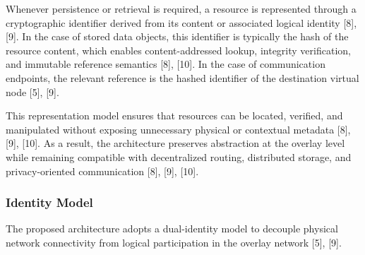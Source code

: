 \documentclass[12pt,a4paper]{article}
\begin{document}
Whenever persistence or retrieval is required, a resource is represented through a
cryptographic identifier derived from its content or associated logical identity [8], [9].
In the case of stored data objects, this identifier is typically the hash of the resource content,
which enables content-addressed lookup, integrity verification, and immutable
reference semantics [8], [10]. In the case of communication endpoints, the relevant reference is
the hashed identifier of the destination virtual node [5], [9].

This representation model ensures that resources can be located, verified, and
manipulated without exposing unnecessary physical or contextual metadata [8], [9], [10]. As a
result, the architecture preserves abstraction at the overlay level while remaining
compatible with decentralized routing, distributed storage, and privacy-oriented
communication [8], [9], [10].

\subsubsection{Identity Model}

The proposed architecture adopts a dual-identity model to decouple physical network connectivity from logical participation in the overlay network [5], [9].
\end{document}
